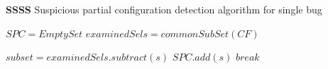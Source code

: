 \begin{algorithm}
\caption{\textbf{SSSS} Suspicious partial configuration detection algorithm for single bug}	
 \label{alg_1}
\begin{algorithmic}[1]
\State $SPC = EmptySet$
\State $examinedSels = commonSubSet(CF)$


	\State $subset = examinedSels.subtract(s)$
			\State $SPC.add(s)$
			\State $break$
		\EndIf
	\EndFor
\EndFor
\EndProcedure
\Statex

%
\end{algorithmic}
\end{algorithm}
